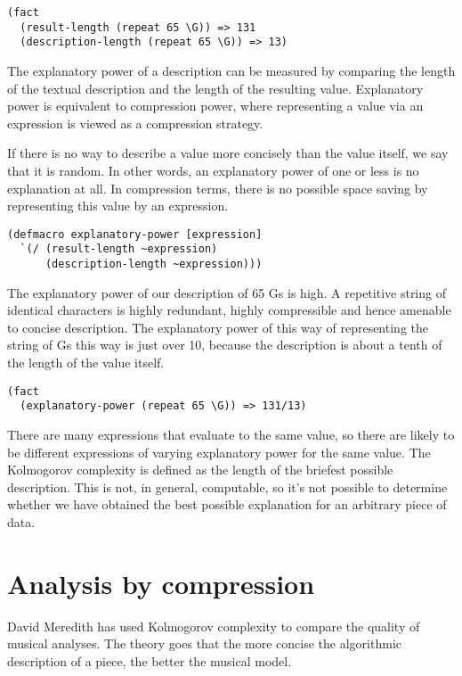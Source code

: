 \documentclass[numbers]{sigplanconf}
\begin{document}
\begin{verbatim}
(fact
  (result-length (repeat 65 \G)) => 131
  (description-length (repeat 65 \G)) => 13)
\end{verbatim}

The explanatory power of a description can be measured by comparing the length of the textual description and the length
of the resulting value. Explanatory power is equivalent to compression power, where representing a value via an
expression is viewed as a compression strategy.

If there is no way to describe a value more concisely than the value itself, we say that it is random. In other words, an
explanatory power of one or less is no explanation at all. In compression terms, there is no possible space saving
by representing this value by an expression.

\begin{verbatim}
(defmacro explanatory-power [expression]
  `(/ (result-length ~expression)
      (description-length ~expression)))
\end{verbatim}

The explanatory power of our description of 65 Gs is high. A repetitive string of identical characters is
highly redundant, highly compressible and hence amenable to concise description. The explanatory power of this way of
representing the string of Gs this way is just over 10, because the description is about a tenth of the length of the
value itself.

\begin{verbatim}
(fact
  (explanatory-power (repeat 65 \G)) => 131/13)
\end{verbatim}

There are many expressions that evaluate to the same value, so there are likely to be different expressions of varying
explanatory power for the same value. The Kolmogorov complexity is defined as the length of the briefest possible description.
This is not, in general, computable, so it's not possible to determine whether we have obtained the best possible explanation
for an arbitrary piece of data.

\section{Analysis by compression}

David Meredith has used Kolmogorov complexity to compare the quality of musical analyses. The theory goes that the
more concise the algorithmic description of a piece, the better the musical model.
\end{document}
